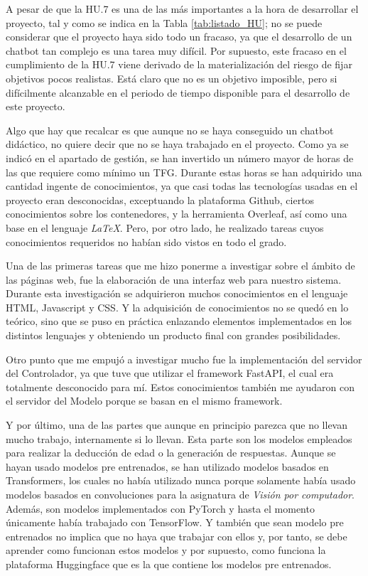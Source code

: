 A pesar de que la HU.7 es una de las más importantes a la hora de desarrollar el proyecto, tal y como se indica en la Tabla \ref{tab:listado_HU}; no se puede considerar que el proyecto haya sido todo un fracaso, ya que el desarrollo de un chatbot tan complejo es una tarea muy difícil. Por supuesto, este fracaso en el cumplimiento de la HU.7 viene derivado de la materialización del riesgo de fijar objetivos pocos realistas. Está claro que no es un objetivo imposible, pero si difícilmente alcanzable en el periodo de tiempo disponible para el desarrollo de este proyecto.

Algo que hay que recalcar es que aunque no se haya conseguido un chatbot didáctico, no quiere decir que no se haya trabajado en el proyecto. Como ya se indicó en el apartado de gestión, se han invertido un número mayor de horas de las que requiere como mínimo un TFG. Durante estas horas se han adquirido una cantidad ingente de conocimientos, ya que casi todas las tecnologías usadas en el proyecto eran desconocidas, exceptuando la plataforma Github, ciertos conocimientos sobre los contenedores, y la herramienta Overleaf, así como una base en el lenguaje \textit{LaTeX}. Pero, por otro lado, he realizado tareas cuyos conocimientos requeridos no habían sido vistos en todo el grado.

Una de las primeras tareas que me hizo ponerme a investigar sobre el ámbito de las páginas web, fue la elaboración de una interfaz web para nuestro sistema. Durante esta investigación se adquirieron muchos conocimientos en el lenguaje HTML, Javascript y CSS. Y la adquisición de conocimientos no se quedó en lo teórico, sino que se puso en práctica enlazando elementos implementados en los distintos lenguajes y obteniendo un producto final con grandes posibilidades.

Otro punto que me empujó a investigar mucho fue la implementación del servidor del Controlador, ya que tuve que utilizar el framework FastAPI, el cual era totalmente desconocido para mí. Estos conocimientos también me ayudaron con el servidor del Modelo porque se basan en el mismo framework.

Y por último, una de las partes que aunque en principio parezca que no llevan mucho trabajo, internamente si lo llevan. Esta parte son los modelos empleados para realizar la deducción de edad o la generación de respuestas. Aunque se hayan usado modelos pre entrenados, se han utilizado modelos basados en Transformers, los cuales no había utilizado nunca porque solamente había usado modelos basados en convoluciones para la asignatura de \textit{Visión por computador}. Además, son modelos implementados con PyTorch y hasta el momento únicamente había trabajado con TensorFlow. Y también que sean modelo pre entrenados no implica que no haya que trabajar con ellos y, por tanto, se debe aprender como funcionan estos modelos y por supuesto, como funciona la plataforma Huggingface que es la que contiene los modelos pre entrenados.

